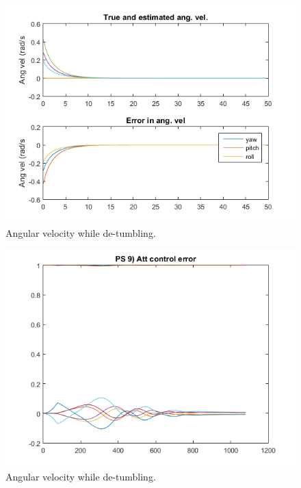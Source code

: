 \documentclass[12pt, letterpaper]{article}
\begin{document}
\begin{figure}[H]
	\centering
	\includegraphics[scale=0.9]{ps8_02}
	\caption{Angular velocity while de-tumbling.}
	\label{8:angvel}
\end{figure}


\begin{figure}[H]
	\centering
	\includegraphics[scale=0.9]{ps8_03}
	\caption{Angular velocity while de-tumbling.}
	\label{8:angvel}
\end{figure}
\end{document}
